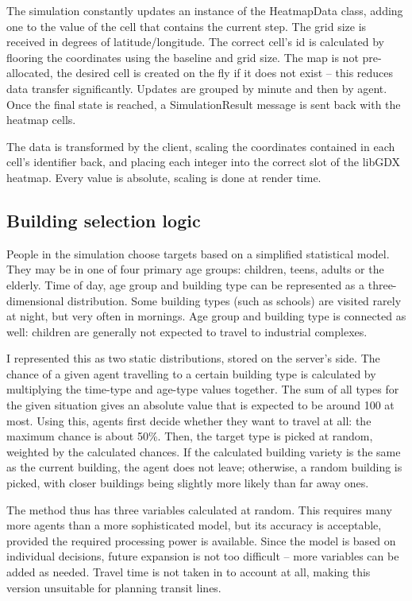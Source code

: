 The simulation constantly updates an instance of the HeatmapData class, adding one to the value of the cell that contains the current step. The grid size is received in degrees of latitude/longitude. The correct cell's id is calculated by flooring the coordinates using the baseline and grid size. The map is not pre-allocated, the desired cell is created on the fly if it does not exist -- this reduces data transfer significantly. Updates are grouped by minute and then by agent. Once the final state is reached, a SimulationResult message is sent back with the heatmap cells.

The data is transformed by the client, scaling the coordinates contained in each cell's identifier back, and placing each integer into the correct slot of the libGDX heatmap. Every value is absolute, scaling is done at render time.

\subsection{Building selection logic}

People in the simulation choose targets based on a simplified statistical model. They may be in one of four primary age groups: children, teens, adults or the elderly. Time of day, age group and building type can be represented as a three-dimensional distribution. Some building types (such as schools) are visited rarely at night, but very often in mornings. Age group and building type is connected as well: children are generally not expected to travel to industrial complexes. 

I represented this as two static distributions, stored on the server's side. The chance of a given agent travelling to a certain building type is calculated by multiplying the time-type and age-type values together. The sum of all types for the given situation gives an absolute value that is expected to be around 100 at most. Using this, agents first decide whether they want to travel at all: the maximum chance is about 50\%. Then, the target type is picked at random, weighted by the calculated chances. If the calculated building variety is the same as the current building, the agent does not leave; otherwise, a random building is picked, with closer buildings being slightly more likely than far away ones.

The method thus has three variables calculated at random. This requires many more agents than a more sophisticated model, but its accuracy is acceptable, provided the required processing power is available. Since the model is based on individual decisions, future expansion is not too difficult -- more variables can be added as needed. Travel time is not taken in to account at all, making this version unsuitable for planning transit lines.